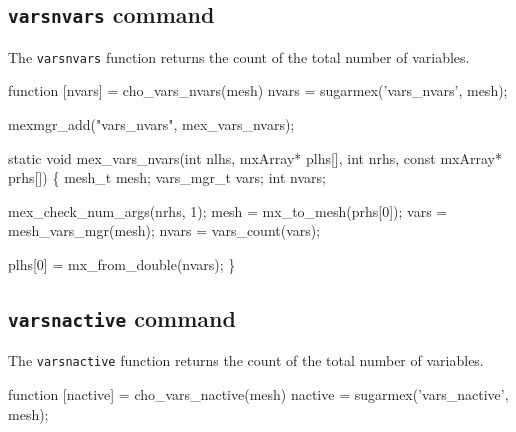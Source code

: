 \nwendcode{}\nwdocspar


\subsection{{\tt{}vars{}nvars} command}

The {\tt{}vars{}nvars} function returns the count of the total
number of variables.

\nwenddocs{}\endmoddef
function [nvars] = cho_vars_nvars(mesh)
nvars = sugarmex('vars_nvars', mesh);
\nwendcode{}\nwdocspar

\nwenddocs{}\plusendmoddef
mexmgr_add("vars_nvars", mex_vars_nvars);
\nwendcode{}\nwdocspar

\nwenddocs{}\plusendmoddef
static void mex_vars_nvars(int nlhs, mxArray* plhs[],
                           int nrhs, const mxArray* prhs[])
\{
    mesh_t     mesh;
    vars_mgr_t vars;
    int        nvars;

    mex_check_num_args(nrhs, 1);
    mesh  = mx_to_mesh(prhs[0]);
    vars  = mesh_vars_mgr(mesh);
    nvars = vars_count(vars);

    plhs[0] = mx_from_double(nvars);
\}

\nwendcode{}\nwdocspar


\subsection{{\tt{}vars{}nactive} command}

The {\tt{}vars{}nactive} function returns the count of the total
number of variables.

\nwenddocs{}\endmoddef
function [nactive] = cho_vars_nactive(mesh)
nactive = sugarmex('vars_nactive', mesh);
\nwendcode{}\nwdocspar

